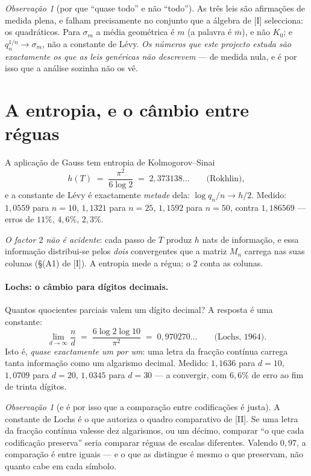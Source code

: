 \documentclass[11pt,a4paper]{article}
\theoremstyle{plain}
\theoremstyle{definition}
\theoremstyle{remark}
\newtheorem{obs}[teorema]{Observação}
\begin{document}
\begin{obs}[por que ``quase todo'' e não ``todo'']\label{obs:quasetodo}
As três leis são afirmações de medida plena, e falham precisamente no conjunto que a álgebra de [I]
selecciona: os quadráticos. Para $\sigma_m$ a média geométrica é $m$ (a palavra é $\overline m$), e
não $K_0$; e $q_n^{1/n}\to\sigma_m$, não a constante de Lévy. \emph{Os números que este projecto
estuda são exactamente os que as leis genéricas não descrevem} --- de medida nula, e é por isso que
a análise sozinha não os vê.
\end{obs}

\section{A entropia, e o câmbio entre réguas}\label{sec:entropia}

A aplicação de Gauss tem entropia de Kolmogorov--Sinai
\[
  h(T) \;=\; \frac{\pi^2}{6\log 2} \;=\; 2{,}373138\ldots \qquad\text{(Rokhlin)},
\]
e a constante de Lévy é exactamente \emph{metade} dela: $\log q_n/n \to h/2$. Medido:
$1{,}0559$ para $n=10$, $1{,}1321$ para $n=25$, $1{,}1592$ para $n=50$, contra $1{,}186569$
--- erros de $11\%$, $4{,}6\%$, $2{,}3\%$.

\emph{O factor $2$ não é acidente}: cada passo de $T$ produz $h$ nats de informação, e essa
informação distribui-se pelos \emph{dois} convergentes que a matriz $M_n$ carrega nas suas colunas
(\S(A1) de [I]). A entropia mede a régua; o $2$ conta as colunas.

\paragraph{Lochs: o câmbio para dígitos decimais.} Quantos quocientes parciais valem um dígito
decimal? A resposta é uma constante:
\[
  \lim_{d\to\infty}\frac{n}{d} \;=\; \frac{6\log2\log10}{\pi^2} \;=\; 0{,}970270\ldots
  \qquad\text{(Lochs, 1964)}.
\]
Isto é, \emph{quase exactamente um por um}: uma letra da fracção contínua carrega tanta informação
como um algarismo decimal. Medido: $1{,}1636$ para $d=10$, $1{,}0709$ para $d=20$, $1{,}0345$ para
$d=30$ --- a convergir, com $6{,}6\%$ de erro ao fim de trinta dígitos.

\begin{obs}[e é por isso que a comparação entre codificações é justa]\label{obs:lochs}
A constante de Lochs é o que autoriza o quadro comparativo de [II]. Se uma letra da fracção contínua
valesse dez algarismos, ou um décimo, comparar ``o que cada codificação preserva'' seria comparar
réguas de escalas diferentes. Valendo $0{,}97$, a comparação é entre iguais --- e o que as distingue
é mesmo o que preservam, não quanto cabe em cada símbolo.
\end{obs}
\end{document}
